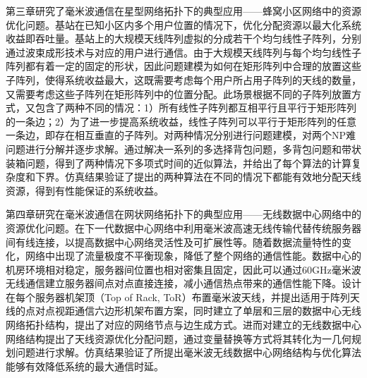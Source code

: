第三章研究了毫米波通信在星型网络拓扑下的典型应用——蜂窝小区网络中的资源优化问题。基站在已知小区内多个用户位置的情况下，优化分配资源以最大化系统收益即吞吐量。基站上的大规模天线阵列虚拟的分成若干个均匀线性子阵列，分别通过波束成形技术与对应的用户进行通信。由于大规模天线阵列与每个均匀线性子阵列都有着一定的固定的形状，因此问题建模为如何在矩形阵列中合理的放置这些子阵列，使得系统收益最大，这既需要考虑每个用户所占用子阵列的天线的数量，又需要考虑这些子阵列在矩形阵列中的位置分配。此场景根据不同的子阵列放置方式，又包含了两种不同的情况：1）所有线性子阵列都互相平行且平行于矩形阵列的一条边；2）为了进一步提高系统收益，线性子阵列可以平行于矩形阵列的任意一条边，即存在相互垂直的子阵列。对两种情况分别进行问题建模，对两个NP难问题进行分解并逐步求解。通过解决一系列的多选择背包问题，多背包问题和带状装箱问题，得到了两种情况下多项式时间的近似算法，并给出了每个算法的计算复杂度和下界。仿真结果验证了提出的两种算法在不同的情况下都能有效地分配天线资源，得到有性能保证的系统收益。

第四章研究在毫米波通信在网状网络拓扑下的典型应用——无线数据中心网络中的资源优化问题。在下一代数据中心网络中利用毫米波高速无线传输代替传统服务器间有线连接，以提高数据中心网络灵活性及可扩展性等。随着数据流量特性的变化，网络中出现了流量极度不平衡现象，降低了整个网络的通信性能。数据中心的机房环境相对稳定，服务器间位置也相对密集且固定，因此可以通过60GHz毫米波无线通信建立服务器间点对点直接连接，减小通信热点带来的通信性能下降。设计在每个服务器机架顶（Top of Rack, ToR）布置毫米波天线，并提出适用于阵列天线的点对点视距通信六边形机架布置方案，同时建立了单层和三层的数据中心无线网络拓扑结构，提出了对应的网络节点与边生成方式。进而对建立的无线数据中心网络结构提出了天线资源优化分配问题，通过变量替换等方式将其转化为一几何规划问题进行求解。仿真结果验证了所提出毫米波无线数据中心网络结构与优化算法能够有效降低系统的最大通信时延。